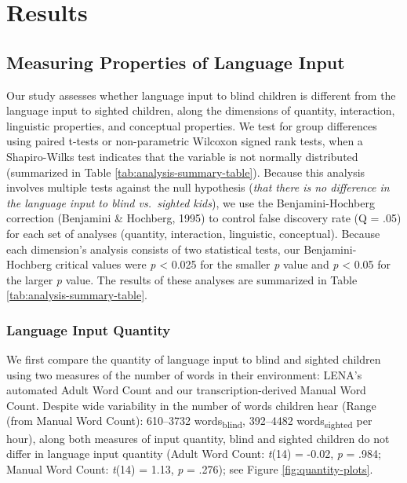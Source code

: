 \documentclass[
  man]{apa6}
\begin{document}
\hypertarget{results}{%
\section{Results}\label{results}}

\hypertarget{measuring-properties-of-language-input}{%
\subsection{Measuring Properties of Language Input}\label{measuring-properties-of-language-input}}

Our study assesses whether language input to blind children is different from the language input to sighted children, along the dimensions of quantity, interaction, linguistic properties, and conceptual properties. We test for group differences using paired t-tests or non-parametric Wilcoxon signed rank tests, when a Shapiro-Wilks test indicates that the variable is not normally distributed (summarized in Table \ref{tab:analysis-summary-table}). Because this analysis involves multiple tests against the null hypothesis (\emph{that there is no difference in the language input to blind vs.~sighted kids}), we use the Benjamini-Hochberg correction (Benjamini \& Hochberg, 1995) to control false discovery rate (Q = .05) for each set of analyses (quantity, interaction, linguistic, conceptual). Because each dimension's analysis consists of two statistical tests, our Benjamini-Hochberg critical values were \emph{p} \textless{} 0.025 for the smaller \emph{p} value and \emph{p} \textless{} 0.05 for the larger \emph{p} value. The results of these analyses are summarized in Table \ref{tab:analysis-summary-table}.

\hypertarget{language-input-quantity}{%
\subsubsection{Language Input Quantity}\label{language-input-quantity}}

We first compare the quantity of language input to blind and sighted children using two measures of the number of words in their environment: LENA's automated Adult Word Count and our transcription-derived Manual Word Count. Despite wide variability in the number of words children hear (Range (from Manual Word Count): 610--3732 words\textsubscript{blind}, 392--4482 words\textsubscript{sighted} per hour), along both measures of input quantity, blind and sighted children do not differ in language input quantity (Adult Word Count: \emph{t}(14) = -0.02, \emph{p} = .984; Manual Word Count: \emph{t}(14) = 1.13, \emph{p} = .276); see Figure \ref{fig:quantity-plots}.
\end{document}
